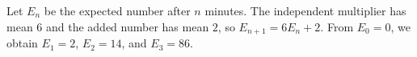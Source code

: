 Let $E_n$ be the expected number after $n$ minutes. The independent multiplier has mean $6$ and the added number has mean $2$, so $E_{n+1}=6E_n+2$. From $E_0=0$, we obtain $E_1=2$, $E_2=14$, and $\boxed{E_3=86}$.
